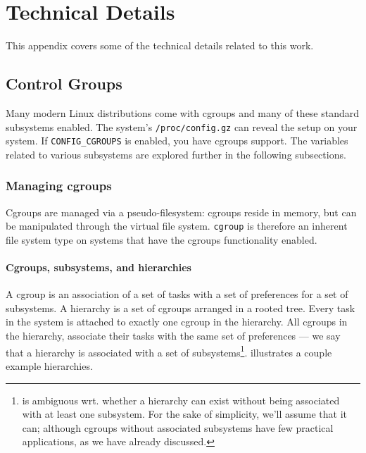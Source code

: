 
\chapter{Technical Details}

This appendix covers some of the technical details related to this work.


\section{Control Groups}

Many modern Linux distributions come with cgroups and many of these standard
subsystems enabled. The system's \texttt{/proc/config.gz} can reveal the setup
on your system\cite{man-5-proc}.  If \texttt{CONFIG\_CGROUPS} is enabled, you
have cgroups support. The variables related to various subsystems are explored
further in the following subsections.

\subsection{Managing cgroups}

Cgroups are managed via a pseudo-filesystem: cgroups reside in memory, but can
be manipulated through the virtual file system.  \texttt{cgroup} is therefore
an inherent file system type on systems that have the cgroups functionality
enabled.

\subsubsection{Cgroups, subsystems, and hierarchies}

A cgroup is an association of a set of tasks with a set of preferences for a
set of subsystems.  A hierarchy is a set of cgroups arranged in a rooted tree.
Every task in the system is attached to exactly one cgroup in the hierarchy.
All cgroups in the hierarchy, associate their tasks with the same set of
preferences --- we say that a hierarchy is associated with a set of
subsystems\footnote{\cite{cgroups.txt} is ambiguous wrt. whether a hierarchy
can exist without being associated with at least one subsystem. For the sake of
simplicity, we'll assume that it can; although cgroups without associated
subsystems have few practical applications, as we have already discussed.}.
 illustrates a couple example hierarchies.

